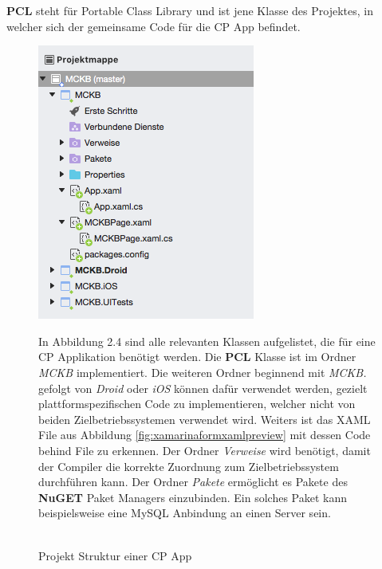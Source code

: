 	\newpage
	\textbf{PCL} steht für Portable Class Library und ist jene Klasse des Projektes, in welcher sich der gemeinsame Code für die CP App befindet.
	
	\begin{figure}[h!]
		\centering
		\begin{minipage}{.4\textwidth}
			\centering
			\includegraphics[width=.9\textwidth]{images/project-structure.png}
        	\label{fig:xamarinformprojectstructure}
			\caption[Projekt Struktur einer CP App]{\\\hspace{\textwidth}Projekt Struktur einer CP App}
		\end{minipage}
		\begin{minipage}{.5\textwidth}
			In Abbildung 2.4 sind alle relevanten Klassen aufgelistet, die für eine CP Applikation benötigt werden. Die \textbf{PCL} Klasse ist im Ordner \textit{MCKB} implementiert. Die weiteren Ordner beginnend mit \textit{MCKB.} gefolgt von \textit{Droid} oder \textit{iOS} können dafür verwendet werden, gezielt plattformspezifischen Code zu implementieren, welcher nicht von beiden Zielbetriebssystemen verwendet wird. 
        	Weiters ist das XAML File aus Abbildung \ref{fig:xamarinaformxamlpreview} mit dessen Code behind File zu erkennen. Der Ordner \textit{Verweise} wird benötigt, damit der Compiler die korrekte Zuordnung zum Zielbetriebssystem durchführen kann. Der Ordner \textit{Pakete} ermöglicht es Pakete des \textbf{NuGET} Paket Managers einzubinden. Ein solches Paket kann beispielsweise eine MySQL Anbindung an einen Server sein.
        \end{minipage}
	\end{figure}
	\newpage

